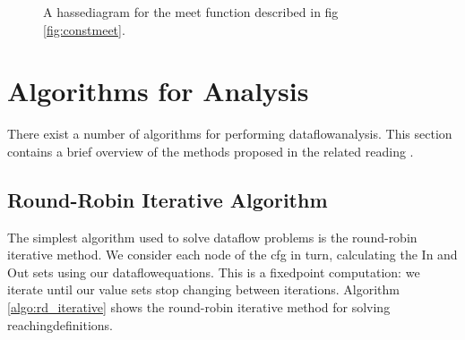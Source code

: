 \documentclass[bsc,twoside,singlespacing,parskip,logo,notimes,normalheadings]{infthesis}
\begin{document}
        \begin{figure}[h]
          \centering
          \caption{A \gls{hassediagram} for the meet function described in fig \ref{fig:constmeet}.}
          \label{fig:consthasse}
        \end{figure}
        
    \pagebreak
    
    \section{Algorithms for Analysis}
    There exist a number of algorithms for performing
    \gls{dataflowanalysis}. This section contains a brief overview of
    the methods proposed in the related reading \cite{eac}
    \cite{dragonbook}.

        \subsection{Round-Robin Iterative Algorithm}
        The simplest algorithm used to solve \gls{dataflow} problems
        is the round-robin iterative method. We consider each node of
        the \gls{cfg} in turn, calculating the In and Out sets using
        our \gls{dataflowequations}. This is a \gls{fixedpoint}
        computation: we iterate until our value sets stop changing
        between iterations. Algorithm \ref{algo:rd_iterative} shows
        the round-robin iterative method for solving
        \gls{reachingdefinition}s.
\end{document}
